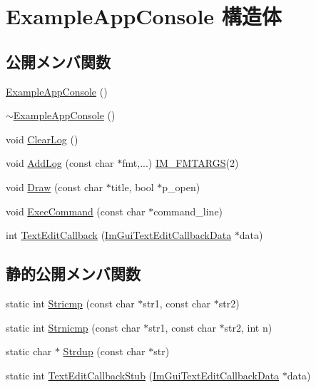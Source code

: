 \hypertarget{struct_example_app_console}{}\section{Example\+App\+Console 構造体}
\label{struct_example_app_console}
\subsection*{公開メンバ関数}
\begin{DoxyCompactItemize}
\item 
\mbox{\hyperlink{struct_example_app_console_a405521e6aa8f97954b67315baf8d6147}{Example\+App\+Console}} ()
\item 
\mbox{\hyperlink{struct_example_app_console_a91ef200056f867cf97a57db91bb991c4}{$\sim$\+Example\+App\+Console}} ()
\item 
void \mbox{\hyperlink{struct_example_app_console_a2ef13f00c474b16b8da2ec062d5e5cc2}{Clear\+Log}} ()
\item 
void \mbox{\hyperlink{struct_example_app_console_a719354ce6be7481923a5fd702e785952}{Add\+Log}} (const char $\ast$fmt,...) \mbox{\hyperlink{imgui_8h_a1251c2f9ddac0873dbad8181bd82c9f1}{I\+M\+\_\+\+F\+M\+T\+A\+R\+GS}}(2)
\item 
void \mbox{\hyperlink{struct_example_app_console_a0518a09c7e8648dd52c7c06df19ac17a}{Draw}} (const char $\ast$title, bool $\ast$p\+\_\+open)
\item 
void \mbox{\hyperlink{struct_example_app_console_aa1e8bf1f3795cbc41597e1ff081c6589}{Exec\+Command}} (const char $\ast$command\+\_\+line)
\item 
int \mbox{\hyperlink{struct_example_app_console_aae97c81ddab660e6e0296c21844c4a7b}{Text\+Edit\+Callback}} (\mbox{\hyperlink{struct_im_gui_text_edit_callback_data}{Im\+Gui\+Text\+Edit\+Callback\+Data}} $\ast$data)
\end{DoxyCompactItemize}
\subsection*{静的公開メンバ関数}
\begin{DoxyCompactItemize}
\item 
static int \mbox{\hyperlink{struct_example_app_console_a6e5e5d66e77618eff0f89785261c9391}{Stricmp}} (const char $\ast$str1, const char $\ast$str2)
\item 
static int \mbox{\hyperlink{struct_example_app_console_a11bcb7a4b801e5eeb0c098c082fedc25}{Strnicmp}} (const char $\ast$str1, const char $\ast$str2, int n)
\item 
static char $\ast$ \mbox{\hyperlink{struct_example_app_console_a61d0da41ef31ea8690b23681a1e54dba}{Strdup}} (const char $\ast$str)
\item 
static int \mbox{\hyperlink{struct_example_app_console_a722d9b5dc6df127f27c83afeee29bfd3}{Text\+Edit\+Callback\+Stub}} (\mbox{\hyperlink{struct_im_gui_text_edit_callback_data}{Im\+Gui\+Text\+Edit\+Callback\+Data}} $\ast$data)
\end{DoxyCompactItemize}
